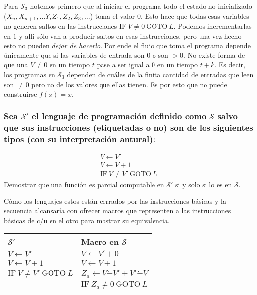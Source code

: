 \documentclass[fleqn, 11pt]{article}
\newcommand{\Scur}{\mathcal{S}}
\newcommand{\into}{\leftarrow}
\newcommand{\IF}{\text{IF}}
\newcommand{\GOTO}{\text{GOTO}}
\begin{document}
Para $\Scur_3$ notemos primero que al iniciar el programa todo el estado no
inicializado ($X_n, X_{n+1}, \dots Y, Z_1, Z_2, Z_3, \dots$) toma el valor 0.
Esto hace que todas esas variables no generen saltos en las instrucciones
$\IF\ V \neq 0\ \GOTO\ L$. Podemos incrementarlas en $1$ y allí sólo van a
producir saltos en esas instrucciones, pero una vez hecho esto no pueden
\emph{dejar de hacerlo}. Por ende el flujo que toma el programa depende
únicamente que si las variables de entrada son $0$ o son $> 0$. No existe forma
de que una $V \neq 0$ en un tiempo $t$ pase a ser igual a $0$ en un tiempo
$t + k$. Es decir, los programas en $\Scur_3$ dependen de cuáles de la
finita cantidad de entradas que leen son $\neq 0$ pero no de los valores que
ellas tienen. Es por esto que no puede construirse $f(x) = x$.

\subsubsection{Sea $\Scur'$ el lenguaje de programación definido como $\Scur$
salvo que sus instrucciones (etiquetadas o no) son de los siguientes tipos (con
su interpretación antural):}
\begin{gather*}
	V \into V' \\
	V \into V + 1 \\
	\IF\ V \neq V'\ \GOTO\ L
\end{gather*}
Demostrar que una función es parcial computable en $\Scur'$ si y solo si lo es
en $\Scur$.

Cómo los lenguajes estos están cerrados por las instrucciones básicas y la
secuencia alcanzaría con ofrecer macros que representen a las instrucciones
básicas de c/u en el otro para mostrar su equivalencia.

\begin{tabular}{l l}
	$\Scur'$                    & Macro en $\Scur$ \\ \toprule
	$V \into V'$                & $V \into V' + 0$ \\
	$V \into V + 1$             & $V \into V  + 1$ \\
	$\IF\ V \neq V'\ \GOTO\ L$  & $Z_a \into V \dot- V' + V' \dot- V$ \\
	                            & $\IF\ Z_a \neq 0\ \GOTO\ L$ \\
\end{tabular}
\end{document}

